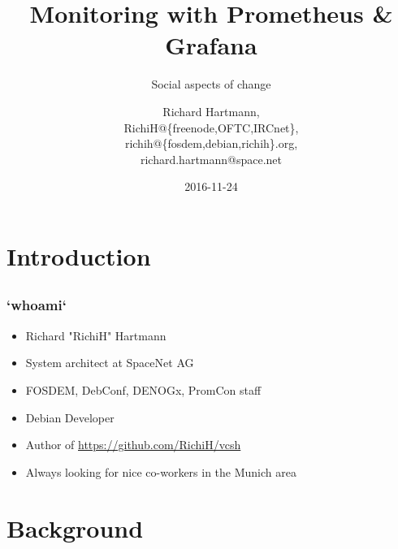 \documentclass[t]{beamer}
\title{Monitoring with Prometheus \& Grafana}
\subtitle{Social aspects of change}
\author{Richard Hartmann,\\
RichiH@\{freenode,OFTC,IRCnet\},\\
richih@\{fosdem,debian,richih\}.org,\\
richard.hartmann@space.net}
\date{2016-11-24}
\begin{document}
\setcounter{tocdepth}{1}

\section{Introduction}

\subsection{}

\begin{frame}
	\titlepage
\end{frame}


\subsection{}

\begin{frame}
	\frametitle{`whoami`}
	\begin{itemize}
		\item Richard "RichiH" Hartmann
		\item System architect at SpaceNet AG
		\item FOSDEM, DebConf, DENOGx, PromCon staff
		\item Debian Developer
		\item Author of \url{https://github.com/RichiH/vcsh}
		\item Always looking for nice co-workers in the Munich area
	\end{itemize}
\end{frame}


\section{Background}

\subsection{}
\end{document}

